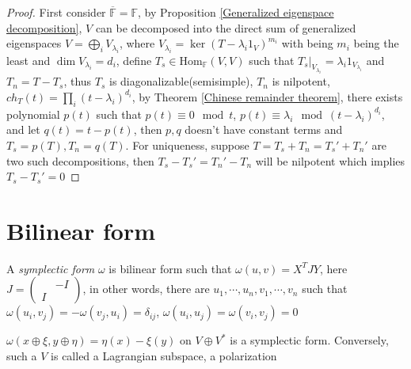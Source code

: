 \documentclass[main]{subfiles}
\begin{document}
\begin{proof}
First consider $\overline{\mathbb F}=\mathbb F$, by Proposition \ref{Generalized eigenspace decomposition}, $V$ can be decomposed into the direct sum of generalized eigenspaces $V=\displaystyle\bigoplus_{i}V_{\lambda_i}$, where $V_{\lambda_i}=\ker(T-\lambda_i1_V)^{m_i}$ with being $m_i$ being the least and $\dim V_{\lambda_i}=d_i$, define $T_s\in\mathrm{Hom}_{\mathbb F}(V,V)$ such that $T_s|_{V_{\lambda_i}}=\lambda_i1_{V_{\lambda_i}}$ and $T_n=T-T_s$, thus $T_s$ is diagonalizable(semisimple), $T_n$ is nilpotent, $ch_T(t)=\displaystyle\prod_{i}(t-\lambda_i)^{d_i}$, by Theorem \ref{Chinese remainder theorem}, there exists polynomial $p(t)$ such that $p(t)\equiv0\mod t$, $p(t)\equiv\lambda_i\mod(t-\lambda_i)^{d_i}$, and let $q(t)=t-p(t)$, then $p,q$ doesn't have constant terms and $T_s=p(T),T_n=q(T)$. For uniqueness, suppose $T=T_s+T_n=T_s'+T_n'$ are two such decompositions, then $T_s-T_s'=T_n'-T_n$ will be nilpotent which implies $T_s-T_s'=0$
\end{proof}



\section{Bilinear form}

\begin{definition}
A \textit{symplectic form} $\omega$ is bilinear form such that $\omega(u,v)=X^TJY$, here $J=\begin{pmatrix}
&-I \\
I&
\end{pmatrix}$, in other words, there are $u_1,\cdots,u_n,v_1,\cdots,v_n$ such that $\omega(u_i,v_j)=-\omega(v_j,u_i)=\delta_{ij}$, $\omega(u_i,u_j)=\omega(v_i,v_j)=0$
\end{definition}

\begin{remark}
$\omega(x\oplus\xi,y\oplus\eta)=\eta(x)-\xi(y)$ on $V\oplus V^*$ is a symplectic form. Conversely, such a $V$ is called a Lagrangian subspace, a polarization
\end{remark}
\end{document}
